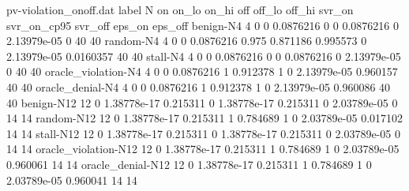 %
%
%
%
\begin{filecontents*}[overwrite]{pv-violation_onoff.dat}
label N on on_lo on_hi off off_lo off_hi svr_on svr_on_cp95 svr_off eps_on eps_off
benign-N4 4 0 0 0.0876216 0 0 0.0876216 0 2.13979e-05 0 40 40
random-N4 4 0 0 0.0876216 0.975 0.871186 0.995573 0 2.13979e-05 0.0160357 40 40
stall-N4 4 0 0 0.0876216 0 0 0.0876216 0 2.13979e-05 0 40 40
oracle_violation-N4 4 0 0 0.0876216 1 0.912378 1 0 2.13979e-05 0.960157 40 40
oracle_denial-N4 4 0 0 0.0876216 1 0.912378 1 0 2.13979e-05 0.960086 40 40
benign-N12 12 0 1.38778e-17 0.215311 0 1.38778e-17 0.215311 0 2.03789e-05 0 14 14
random-N12 12 0 1.38778e-17 0.215311 1 0.784689 1 0 2.03789e-05 0.017102 14 14
stall-N12 12 0 1.38778e-17 0.215311 0 1.38778e-17 0.215311 0 2.03789e-05 0 14 14
oracle_violation-N12 12 0 1.38778e-17 0.215311 1 0.784689 1 0 2.03789e-05 0.960061 14 14
oracle_denial-N12 12 0 1.38778e-17 0.215311 1 0.784689 1 0 2.03789e-05 0.960041 14 14
\end{filecontents*}
